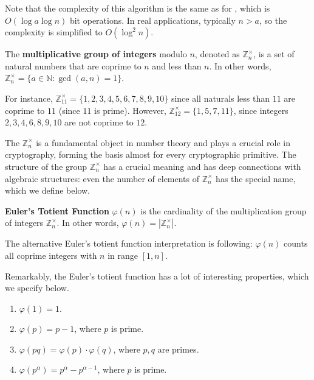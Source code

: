 \documentclass[../lecture-notes-148x210.tex]{subfiles}
\begin{document}
\begin{remark}
    Note that the complexity of this algorithm is the same as for
    , which is $O(\log a \log n)$ bit operations. In real 
    applications, typically $n>a$, so the complexity is simplified to $O(\log^2 n)$.
\end{remark}

\begin{definition}
    The \textbf{multiplicative group of integers} modulo $n$, denoted as $\mathbb{Z}_n^{\times}$, is a set of natural numbers that are coprime to $n$ and less than $n$. In other words, $\mathbb{Z}_n^{\times} = \{a \in \mathbb{N}: \gcd(a, n) = 1\}$.
\end{definition}

\begin{example}
    For instance, $\mathbb{Z}_{11}^{\times} = \{1, 2, 3, 4, 5, 6, 7, 8, 9, 10\}$
    since all naturals less than $11$ are coprime to $11$ (since $11$ is prime).
    However, $\mathbb{Z}_{12}^{\times} = \{1, 5, 7, 11\}$, since integers $2, 3,
    4, 6, 8, 9, 10$ are not coprime to $12$. 
\end{example}

The $\mathbb{Z}_{n}^{\times}$ is a fundamental object in number theory and plays
a crucial role in cryptography, forming the basis almost for every cryptographic
primitive. The structure of the group $\mathbb{Z}_{n}^{\times}$ has a crucial
meaning and has deep connections with algebraic structures: even the number of 
elements of $\mathbb{Z}_n^{\times}$ has the special name, which we define below.

\begin{definition} \label{def:euler_totient_function}
    \textbf{Euler's Totient Function} $\varphi(n)$ is the cardinality of the multiplication 
    group of integers $\mathbb{Z}_n^{\times}$. In other words, $\varphi(n) = |\mathbb{Z}_n^{\times}|$.
\end{definition}

\begin{remark}
    The alternative Euler's totient function interpretation is following:
    $\varphi(n)$ counts all coprime integers with $n$ in range $[1, n]$. 
\end{remark}

Remarkably, the Euler's totient function has a lot of interesting properties, which we specify below.

\begin{lemma}
    \hfill
    \begin{enumerate}
        \item $\varphi(1) = 1$.
        \item $\varphi(p) = p - 1$, where $p$ is prime.
        \item $\varphi(pq) = \varphi(p) \cdot \varphi(q)$, where $p, q$ are primes.
        \item $\varphi(p^{\alpha}) = p^{\alpha} - p^{\alpha - 1}$, where $p$ is prime.        
    \end{enumerate}    
\end{lemma}
\end{document}
